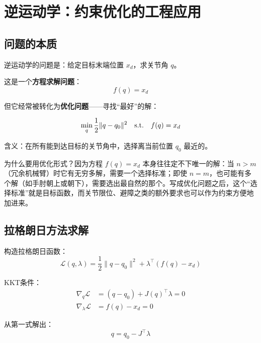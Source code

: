\section{逆运动学：约束优化的工程应用}

\subsection{问题的本质}

逆运动学的问题是：给定目标末端位置 $x_d$，求关节角 $q$。

这是一个\textbf{方程求解问题}：
\[
f(q) = x_d
\]

但它经常被转化为\textbf{优化问题}——寻找“最好”的解：

\begin{keyformula}[title=逆运动学的优化形式]
\begin{equation}
\min_q \frac{1}{2}\|q - q_0\|^2 \quad \text{s.t.} \quad f(q) = x_d
\end{equation}

含义：在所有能到达目标的关节角中，选择离当前位置 $q_0$ 最近的。
\end{keyformula}

\begin{physicalmeaning}
为什么要用优化形式？因为方程 $f(q) = x_d$ 本身往往定不下唯一的解：当 $n > m$（冗余机械臂）时它有无穷多解，需要一个选择标准；即使 $n = m$，也可能有多个解（如手肘朝上或朝下），需要选出最自然的那个。写成优化问题之后，这个“选择标准”就是目标函数，而关节限位、避障之类的额外要求也可以作为约束方便地加进来。
\end{physicalmeaning}

\subsection{拉格朗日方法求解}

构造拉格朗日函数：
\begin{equation}
\mathcal{L}(q, \lambda) = \frac{1}{2}\|q - q_0\|^2 + \lambda^\top (f(q) - x_d)
\end{equation}

KKT条件：
\begin{align}
\nabla_q \mathcal{L} &= (q - q_0) + J(q)^\top \lambda = 0 \\
\nabla_\lambda \mathcal{L} &= f(q) - x_d = 0
\end{align}

从第一式解出：
\begin{equation}
q = q_0 - J^\top \lambda
\end{equation}

